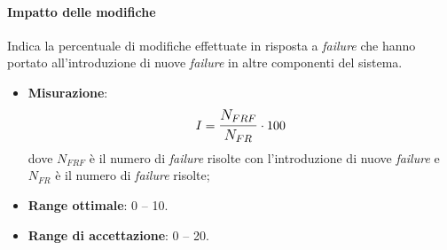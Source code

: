 \paragraph{Impatto delle modifiche}
Indica la percentuale di modifiche effettuate in risposta a \textit{failure} che hanno portato all'introduzione di nuove \textit{failure} in altre componenti del sistema.
\begin{itemize}
	\item \textbf{Misurazione}: 
		$$I=\mathlarger{\frac{N_{FRF}}{N_{FR}}} \cdot 100$$
	dove $N_{FRF}$ è il numero di \textit{failure} risolte con l'introduzione di nuove \textit{failure} e $N_{FR}$ è il numero di \textit{failure} risolte;
	\item \textbf{Range ottimale}: 0 -- 10.
	\item \textbf{Range di accettazione}: 0 -- 20.
\end{itemize}

\newpage
